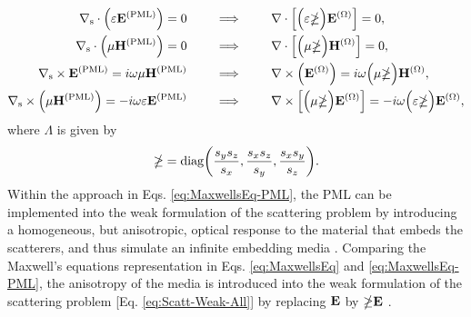     \begin{subequations}
        \label{eq:MaxwellsEq-PML}
    \begin{align}
        \nabla_\text{s} \cdot \qty(\varepsilon \vb{E}^\text{(PML)})  = 0
            \qquad &\implies\qquad
            \nabla \cdot \Big[\Big(\varepsilon \mathbb{\Lambda}\Big)\vb{E}^{(\Omega)}\Big] =  0,
             \\
        \nabla_\text{s}  \cdot    \Big(\mu \vb{H}^\text{(PML)}\Big) = 0
            \qquad &\implies\qquad
            \nabla \cdot \Big[\Big(\mu \mathbb{\Lambda} \Big)\vb{H}^{(\Omega)}\Big] =  0,
            \\
        \nabla_\text{s} \times \vb{E}^\text{(PML)}  = i\omega \mu \vb{H}^\text{(PML)}
            \qquad &\implies\qquad
            \nabla \times \Big(\vb{E}^{(\Omega)}\Big) = i\omega\Big( \mu\mathbb{\Lambda}\Big) \vb{H}^{(\Omega)},
            \\
        \nabla_\text{s}  \times\Big(\mu \vb{H}^\text{(PML)} \Big) =   - i\omega \varepsilon \vb{E}^\text{(PML)}
            \qquad &\implies\qquad
            \nabla \times \Big[\Big(\mu \mathbb{\Lambda}\Big) \vb{E}^{(\Omega)}\Big] =  -i\omega\Big(\varepsilon\mathbb{\Lambda}\Big)\vb{E}^{(\Omega)},
    \end{align}
    \end{subequations}
    where $\mathbb{\Lambda}$ is given by
    \begin{align}
        \mathbb{\Lambda} = \text{diag}\qty(\frac{s_y s_z}{s_x},\frac{s_x s_z}{s_y},\frac{s_x s_y}{s_z}).
    \end{align}
    Within the approach in Eqs. \eqref{eq:MaxwellsEq-PML}, the PML can be implemented into the weak formulation of the scattering problem  by introducing a homogeneous, but anisotropic, optical response to the material that embeds the scatterers, and thus simulate an infinite embedding media \cite{chew_complex_1997,bondeson_computational_2005,jin_theory_2010}. Comparing the Maxwell's equations representation in Eqs. \eqref{eq:MaxwellsEq} and \eqref{eq:MaxwellsEq-PML}, the anisotropy of the media is introduced into the weak formulation of the scattering problem [Eq. \eqref{eq:Scatt-Weak-All}] by replacing $\vb{E}$ by $\mathbb{\Lambda}\vb{E}$ \cite{jin_theory_2010}.

